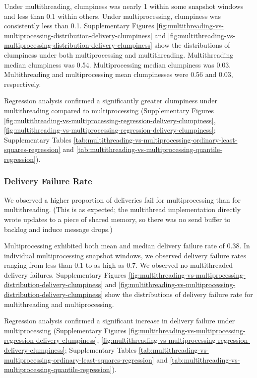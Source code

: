 Under multithreading, clumpiness was nearly 1 within some snapshot windows and less than 0.1 within others.
Under multiprocessing, clumpiness was consistently less than 0.1.
Supplementary Figures \ref{fig:multithreading-vs-multiprocessing-distribution-delivery-clumpiness} and \ref{fig:multithreading-vs-multiprocessing-distribution-delivery-clumpiness} show the distributions of clumpiness under both multiprocessing and multithreading.
Multithreading median clumpiness was 0.54.
Multiprocessing median clumpiness was 0.03.
Multithreading and multiprocessing mean clumpinesses were 0.56 and 0.03, respectively.

Regression analysis confirmed a significantly greater clumpiness under multithreading compared to multiprocessing (Supplementary Figures \ref{fig:multithreading-vs-multiprocessing-regression-delivery-clumpiness}, \ref{fig:multithreading-vs-multiprocessing-regression-delivery-clumpiness}; Supplementary Tables \ref{tab:multithreading-vs-multiprocessing-ordinary-least-squares-regression} and \ref{tab:multithreading-vs-multiprocessing-quantile-regression}).

\subsubsection{Delivery Failure Rate}

We observed a higher proportion of deliveries fail for multiprocessing than for multithreading.
(This is as expected; the multithread implementation directly wrote updates to a piece of shared memory, so there was no send buffer to backlog and induce message drops.)

Multiprocessing exhibited both mean and median delivery failure rate of 0.38.
In individual multiprocessing snapshot windows, we observed delivery failure rates ranging from less than 0.1 to as high as 0.7.
We observed no multithreaded delivery failures.
Supplementary Figures \ref{fig:multithreading-vs-multiprocessing-distribution-delivery-clumpiness} and \ref{fig:multithreading-vs-multiprocessing-distribution-delivery-clumpiness} show the distributions of delivery failure rate for multithreading and multiprocessing.

Regression analysis confirmed a significant increase in delivery failure under multiprocessing (Supplementary Figures \ref{fig:multithreading-vs-multiprocessing-regression-delivery-clumpiness}, \ref{fig:multithreading-vs-multiprocessing-regression-delivery-clumpiness}; Supplementary Tables \ref{tab:multithreading-vs-multiprocessing-ordinary-least-squares-regression} and \ref{tab:multithreading-vs-multiprocessing-quantile-regression}).
